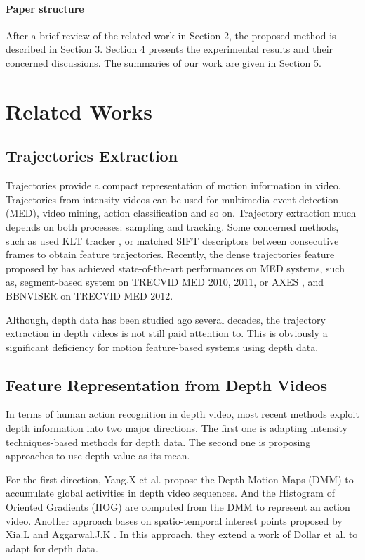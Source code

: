 \documentclass[review]{elsarticle}
\begin{document}
\paragraph{Paper structure}After a brief review of the related work in Section 2, the proposed method is described in Section 3. Section 4 presents the experimental results and their concerned discussions. The summaries of our work are given in Section 5.

\section{Related Works}

\subsection{Trajectories Extraction}
Trajectories provide a compact representation of motion information in video. Trajectories from intensity videos can be used for multimedia event detection (MED), video mining, action classification and so on. Trajectory extraction much depends on both processes: sampling and tracking. Some concerned methods, such as \cite{matikainen2009trajectons, messing2009activity} used KLT tracker \cite{lucas1981iterative}, or \cite{sun2009hierarchical} matched  SIFT descriptors between consecutive frames to obtain feature trajectories. Recently, the dense trajectories feature proposed by \cite{wang2011densetraj} has achieved state-of-the-art performances on MED systems, such as, segment-based system \cite{phan2014multimedia} on TRECVID MED 2010, 2011, or AXES \cite{oneata2012axes}, and BBNVISER \cite{natarajan2012bbn} on TRECVID MED 2012.

Although, depth data has been studied ago several decades, the trajectory extraction in depth videos is not still paid attention to. This is obviously a significant deficiency for motion feature-based systems using depth data.

\subsection{Feature Representation from Depth Videos}
In terms of human action recognition in depth video, most recent methods exploit depth information into two major directions. The first one is adapting intensity techniques-based methods for depth data. The second one is proposing approaches to use depth value as its mean.

For the first direction, Yang.X et al. \cite{yang2012recognizing} propose the Depth Motion Maps (DMM) to accumulate global activities in depth video sequences. And the Histogram of Oriented Gradients (HOG) are computed from the DMM to represent an action video. Another approach bases on spatio-temporal interest points proposed by Xia.L and Aggarwal.J.K \cite{xia2013spatio}. In this approach, they extend a work of Dollar et al. \cite{dollar2005behavior} to adapt for depth data.
\end{document}
